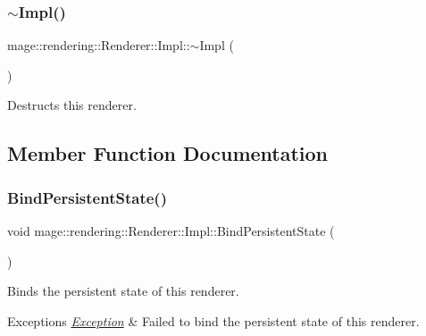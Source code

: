 \subsubsection{\texorpdfstring{$\sim$\+Impl()}{~Impl()}}
{\footnotesize\ttfamily mage\+::rendering\+::\+Renderer\+::\+Impl\+::$\sim$\+Impl (\begin{DoxyParamCaption}{ }\end{DoxyParamCaption})\hspace{0.3cm}{\ttfamily [default]}}

Destructs this renderer. 

\subsection{Member Function Documentation}
\hypertarget{classmage_1_1rendering_1_1_renderer_1_1_impl_a86f42e039c290e75378040805533bd41}{}\label{classmage_1_1rendering_1_1_renderer_1_1_impl_a86f42e039c290e75378040805533bd41} 
\subsubsection{\texorpdfstring{Bind\+Persistent\+State()}{BindPersistentState()}}
{\footnotesize\ttfamily void mage\+::rendering\+::\+Renderer\+::\+Impl\+::\+Bind\+Persistent\+State (\begin{DoxyParamCaption}{ }\end{DoxyParamCaption})}

Binds the persistent state of this renderer.


\begin{DoxyExceptions}{Exceptions}
{\em \hyperlink{classmage_1_1_exception}{Exception}} & Failed to bind the persistent state of this renderer. \\
\hline
\end{DoxyExceptions}
\hypertarget{classmage_1_1rendering_1_1_renderer_1_1_impl_a0db15a325a2e2242a76323b27acec12f}{}\label{classmage_1_1rendering_1_1_renderer_1_1_impl_a0db15a325a2e2242a76323b27acec12f} 
